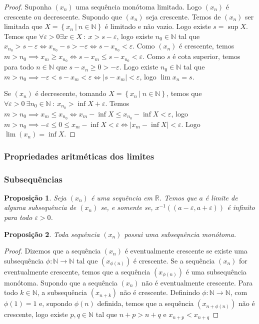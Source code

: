 \documentclass{article}
\theoremstyle{plain}
\newtheorem{prop}{Proposição}[section]
\theoremstyle{definition}
\theoremstyle{remark}
\begin{document}
\begin{proof}
	Suponha $(x_n)$ uma sequência monótoma limitada. Logo $(x_n)$ é crescente ou decrescente.
	Supondo que $(x_n)$ seja crescente. Temos de $(x_n)$ ser limitada que $X = \left\{ x_n \: | \: n\in \mathbb{N} \right\}$ é limitado e não vazio. Logo existe $s = \sup X$. Temos que $\forall \varepsilon>0 \exists x \in X \: : \: x > s - \varepsilon$, logo existe $n_0 \in \mathbb{N}$ tal que $x_{n_0} > s - \varepsilon \iff x_{n_0} -s > -\varepsilon \iff s - x_{n_0}< \varepsilon$. Como $(x_n)$ é crescente, temos $m > n_0 \implies x_m \geq x_{n_0} \iff s-x_{m} \leq s- x_{n_0} < \varepsilon$.  Como $s$ é cota superior, temos para todo $n\in \mathbb{N}$ que  $s - x_n \geq 0  > -\varepsilon$. Logo existe $n_0\in \mathbb{N}$ tal que $m > n_0 \implies -\varepsilon < s - x_m < \varepsilon \iff |s-x_m| < \varepsilon$, logo $\lim x_n = s$.

	Se $(x_n)$ é decrescente, tomando $X = \left\{x_n \: | \: n\in \mathbb{N}\right\}$,  temos que $\forall \varepsilon >0 \: \exists n_0\in \mathbb{N} \: : \: x_{n_0} > \inf X +\varepsilon$. Temos $m > n_0 \implies x_m \leq x_{n_0} \iff x_m - \inf X \leq x_{n_0} -\inf X < \varepsilon$, logo $m>n_0 \implies -\varepsilon \leq 0 \leq x_m - \inf X < \varepsilon \iff |x_m - \inf X | < \varepsilon$. Logo $\lim (x_n) = \inf X$.
\end{proof}
   \subsubsection{ Propriedades aritméticas dos limites}
   \subsubsection{ Subsequências}
\begin{prop}
	Seja $(x_n)$ é uma sequência em $\mathbb{R}$. Temos que $a$ é limite de alguma subsequência de $(x_n)$ se, e somente se, $x^{-1}((a-\varepsilon, a+\varepsilon))$ é infinito para todo $\varepsilon>0$.
\end{prop}
\begin{prop}
	Toda sequência $(x_n)$ possui uma subsequência monótoma.
\end{prop}
\begin{proof}
	Dizemos que a sequência $(x_n)$ é eventualmente crescente se existe uma subsequência $\phi:\mathbb{N} \to \mathbb{N}$ tal que $(x_{\phi(n)})$ é crescente. Se a sequência $(x_n)$ for eventualmente crescente, temos que a sequência $(x_{\phi(n)})$ é  uma subsequência monótoma.
	Supondo que a sequência $(x_n)$ não é eventualmente crescente.  Para todo $k\in \mathbb{N}$, a subsequência $(x_{n+k})$ não é crescente. Definindo $\phi: \mathbb{N} \to \mathbb{N}$, com $\phi(1) = 1$ e, supondo $\phi(n)$ definida, temos que a sequência $(x_{n+\phi(n)})$ não é crescente, logo existe $p,q\in \mathbb{N}$ tal que $n+p>n+q$ e $x_{n+p} < x_{n+q}$
\end{proof}
\end{document}
